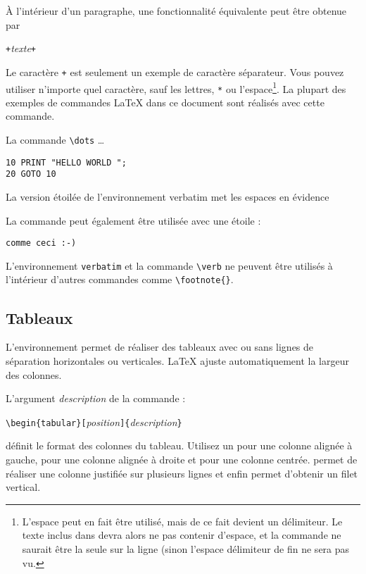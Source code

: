 À l'intérieur d'un paragraphe, une fonctionnalité équivalente peut
être obtenue par
\begin{lscommand}
\verb|+|\emph{texte}\verb|+|
\end{lscommand}
\noindent Le caractère \verb|+| est seulement un exemple de caractère
séparateur. Vous pouvez utiliser n'importe quel caractère, sauf les
lettres, \verb|*| ou l'espace\footnote{L'espace peut en fait être
  utilisé, mais de ce fait devient un délimiteur. Le texte inclus dans
   devra alors ne pas contenir d'espace, et la commande ne
  saurait être la seule sur la ligne (sinon l'espace délimiteur de fin
  ne sera pas vu.}.
La plupart des exemples de commandes
\LaTeX{} dans ce document sont réalisés avec cette commande.

\begin{example}
La commande \verb|\dots| \dots

\begin{verbatim}
10 PRINT "HELLO WORLD ";
20 GOTO 10
\end{verbatim}
\end{example}

\begin{example}
\begin{verbatim*}
La version étoilée de
l'environnement  verbatim
met    les   espaces   en
évidence
\end{verbatim*}
\end{example}

La commande  peut également être utilisée avec une étoile :
\begin{example}
\verb*|comme ceci :-) |
\end{example}

L'environnement \texttt{verbatim} et la commande \verb|\verb| ne
peuvent être utilisés à l'intérieur d'autres commandes comme
\verb|\footnote{}|.


\subsection{Tableaux}

\newcommand{\mfr}[1]{\framebox{\rule{0pt}{0.7em}\texttt{#1}}}

L'environnement  permet de réaliser des tableaux avec ou
sans lignes de séparation horizontales ou verticales. \LaTeX{}
ajuste automatiquement la largeur des colonnes.

L'argument \emph{description} de la commande :
\begin{lscommand}
\verb|\begin{tabular}[|\emph{position}\verb|]{|\emph{description}\verb|}|
\end{lscommand}
\noindent définit le format des colonnes du tableau. Utilisez un
\mfr{l} pour une colonne alignée à gauche, \mfr{r} pour
une colonne alignée à droite et \mfr{c} pour une colonne
centrée. \mfr{p{\{\emph{largeur}\}}} permet de réaliser une colonne
justifiée sur plusieurs lignes et enfin
\mfr{|} permet d'obtenir un filet vertical.

